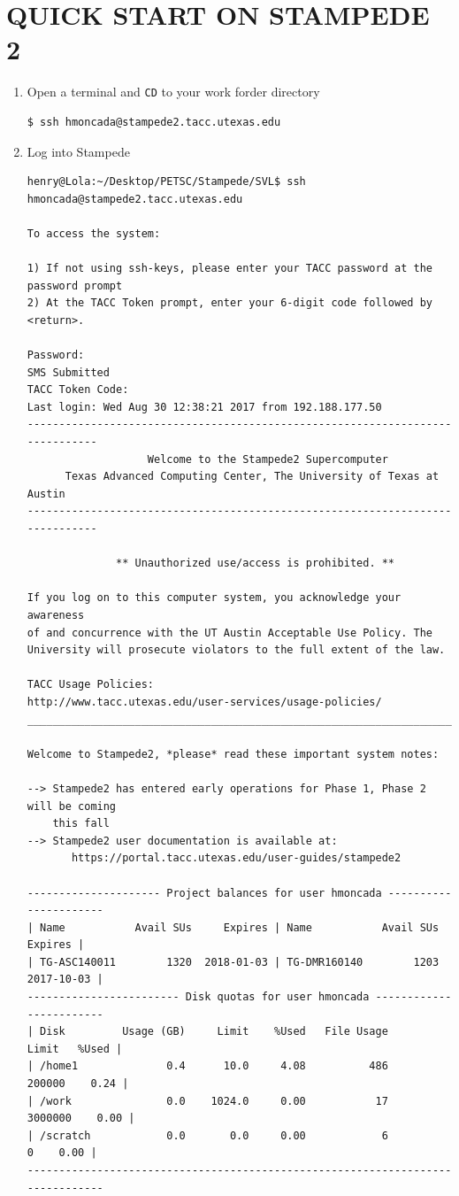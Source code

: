 \documentclass{article}
\begin{document}
\section{QUICK START ON STAMPEDE 2}
\begin{enumerate}
\item Open a terminal and \verb+CD+ to your work forder directory 
\scriptsize
\begin{verbatim}
$ ssh hmoncada@stampede2.tacc.utexas.edu
\end{verbatim}
\normalsize
\item Log into Stampede 
\scriptsize
\begin{verbatim}
henry@Lola:~/Desktop/PETSC/Stampede/SVL$ ssh hmoncada@stampede2.tacc.utexas.edu

To access the system:

1) If not using ssh-keys, please enter your TACC password at the password prompt
2) At the TACC Token prompt, enter your 6-digit code followed by <return>.  

Password: 
SMS Submitted
TACC Token Code:
Last login: Wed Aug 30 12:38:21 2017 from 192.188.177.50
------------------------------------------------------------------------------
                   Welcome to the Stampede2 Supercomputer
      Texas Advanced Computing Center, The University of Texas at Austin
------------------------------------------------------------------------------

              ** Unauthorized use/access is prohibited. **

If you log on to this computer system, you acknowledge your awareness
of and concurrence with the UT Austin Acceptable Use Policy. The
University will prosecute violators to the full extent of the law.

TACC Usage Policies:
http://www.tacc.utexas.edu/user-services/usage-policies/
______________________________________________________________________________

Welcome to Stampede2, *please* read these important system notes:

--> Stampede2 has entered early operations for Phase 1, Phase 2 will be coming
    this fall
--> Stampede2 user documentation is available at:
       https://portal.tacc.utexas.edu/user-guides/stampede2

--------------------- Project balances for user hmoncada ----------------------
| Name           Avail SUs     Expires | Name           Avail SUs     Expires |
| TG-ASC140011        1320  2018-01-03 | TG-DMR160140        1203  2017-10-03 | 
------------------------ Disk quotas for user hmoncada ------------------------
| Disk         Usage (GB)     Limit    %Used   File Usage       Limit   %Used |
| /home1              0.4      10.0     4.08          486      200000    0.24 |
| /work               0.0    1024.0     0.00           17     3000000    0.00 |
| /scratch            0.0       0.0     0.00            6           0    0.00 |
-------------------------------------------------------------------------------


\end{verbatim}
\end{enumerate}
\end{document}
